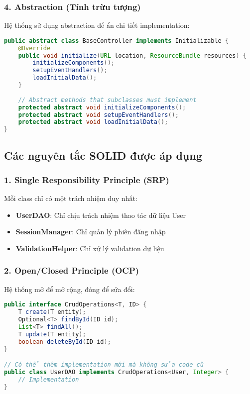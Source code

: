 \documentclass[12pt,a4paper]{article}
\begin{document}
\subsubsection{4. Abstraction (Tính trừu tượng)}

Hệ thống sử dụng abstraction để ẩn chi tiết implementation:

\begin{lstlisting}[language=Java, caption=Ví dụ về Abstraction với BaseController]
public abstract class BaseController implements Initializable {
    @Override
    public void initialize(URL location, ResourceBundle resources) {
        initializeComponents();
        setupEventHandlers();
        loadInitialData();
    }
    
    // Abstract methods that subclasses must implement
    protected abstract void initializeComponents();
    protected abstract void setupEventHandlers();
    protected abstract void loadInitialData();
}
\end{lstlisting}

\subsection{Các nguyên tắc SOLID được áp dụng}

\subsubsection{1. Single Responsibility Principle (SRP)}

Mỗi class chỉ có một trách nhiệm duy nhất:

\begin{itemize}
    \item \textbf{UserDAO}: Chỉ chịu trách nhiệm thao tác dữ liệu User
    \item \textbf{SessionManager}: Chỉ quản lý phiên đăng nhập
    \item \textbf{ValidationHelper}: Chỉ xử lý validation dữ liệu
\end{itemize}

\subsubsection{2. Open/Closed Principle (OCP)}

Hệ thống mở để mở rộng, đóng để sửa đổi:

\begin{lstlisting}[language=Java, caption=Ví dụ về OCP với CrudOperations interface]
public interface CrudOperations<T, ID> {
    T create(T entity);
    Optional<T> findById(ID id);
    List<T> findAll();
    T update(T entity);
    boolean deleteById(ID id);
}

// Có thể thêm implementation mới mà không sửa code cũ
public class UserDAO implements CrudOperations<User, Integer> {
    // Implementation
}
\end{lstlisting}
\end{document}
